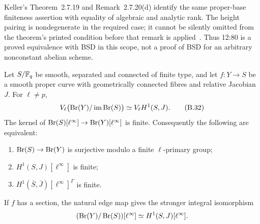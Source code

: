 Keller's Theorem~2.7.19 and Remark~2.7.20(d) identify the same
proper-base finiteness assertion with equality of algebraic and
analytic rank.  The height pairing is nondegenerate in the required
case; it cannot be silently omitted from the theorem's printed
condition before that remark is applied~\cite{BKeller2019}.
Thus 12:80 is a proved equivalence with BSD in this scope, not a
proof of BSD for an arbitrary nonconstant abelian scheme.

\begin{proposition}
\label{prop:B-relative-curve}
Let \(S/\mathbb F_q\) be smooth, separated and connected of finite type,
and let \(f:Y\to S\) be a smooth proper curve with geometrically
connected fibres and relative Jacobian \(J\).  For \(\ell\ne p\),
\[
 V_\ell\bigl(\operatorname{Br}(Y)/\operatorname{im}\operatorname{Br}(S)\bigr)
 \simeq V_\ell H^1(S,J).
 \tag{B.32}
\]
The kernel of \(\operatorname{Br}(S)[\ell^\infty]\to\operatorname{Br}(Y)[\ell^\infty]\)
is finite.  Consequently the following are equivalent:
\begin{enumerate}
\item \(\operatorname{Br}(S)\to\operatorname{Br}(Y)\) is surjective modulo a finite
\(\ell\)-primary group;
\item \(H^1(S,J)[\ell^\infty]\) is finite;
\item \(H^1(\bar S,\bar J)[\ell^\infty]^\Gamma\) is finite.
\end{enumerate}
If \(f\) has a section, the natural edge map gives the stronger
integral isomorphism
\[
 (\operatorname{Br}(Y)/\operatorname{Br}(S))[\ell^\infty]
 \simeq H^1(S,J)[\ell^\infty].
\]
\end{proposition}
